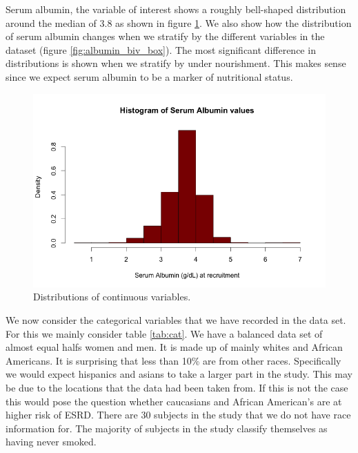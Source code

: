 \documentclass[paper=a4, fontsize=11pt]{scrartcl} %
\numberwithin{equation}{section} %
\numberwithin{figure}{section} %
\numberwithin{table}{section} %
\begin{document}
Serum albumin, the variable of interest shows a roughly bell-shaped distribution around the median of 3.8 as shown in figure \ref{fig:albumin_hist}. We also show how the distribution of serum albumin changes when we stratify by the different variables in the dataset (figure \ref{fig:albumin_biv_box}). The most significant difference in distributions is shown when we stratify by under nourishment. This makes sense since we expect serum albumin to be a marker of nutritional status.

\begin{figure}[H]
\centering
\includegraphics[width=.6\textwidth]{plots/albumin_hist.png}
\caption{Distributions of continuous variables.}
\label{fig:albumin_hist}
\end{figure}

We now consider the categorical variables that we have recorded in the data set. For this we mainly consider table \ref{tab:cat}. We have a balanced data set of almost equal halfs women and men. It is made up of mainly whites and African Americans. It is surprising that less than 10\% are from other races. Specifically we would expect hispanics and asians to take a larger part in the study. This may be due to the locations that the data had been taken from. If this is not the case this would pose the question whether caucasians and African American's are at higher risk of ESRD. There are 30 subjects in the study that we do not have race information for.
The majority of subjects in the study classify themselves as having never smoked. 
\end{document}
